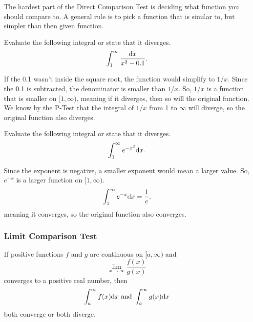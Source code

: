 The hardest part of the Direct Comparison Test is deciding what function you should compare to.
A general rule is to pick a function that is similar to, but simpler than then given function.

\begin{example}
	Evaluate the following integral or state that it diverges.
	\begin{equation*}
		\int_{1}^{\infty}{\frac{\mathrm{d} x}{x^2-0.1}}.
	\end{equation*}
\end{example}
\begin{answer}
	If the 0.1 wasn't inside the square root, the function would simplify to $1/x$.
	Since the 0.1 is subtracted, the denominator is smaller than $1/x$.
	So, $1/x$ is a function that is smaller on $[1,\infty)$, meaning if it diverges, then so will the original function.
	We know by the P-Test that the integral of $1/x$ from 1 to $\infty$ will diverge, so the original function also diverges.
\end{answer}

\begin{example}
	Evaluate the following integral or state that it diverges.
	\begin{equation*}
		\int_{1}^{\infty}{e^{-x^2}\mathrm{d} x}.
	\end{equation*}
\end{example}
\begin{answer}
	Since the exponent is negative, a smaller exponent would mean a larger value.
	So, $e^{-x}$ is a larger function on $[1,\infty)$.
	\begin{equation*}
		\int_{1}^{\infty}{e^{-x}\mathrm{d} x} = \frac{1}{e},
	\end{equation*}
	meaning it converges, so the original function also converges.
\end{answer}

\subsubsection{Limit Comparison Test}
\begin{lemma}
	If positive functions $f$ and $g$ are continuous on $[a,\infty)$ and
	\begin{equation*}
		\lim_{x\to\infty}{\frac{f(x)}{g(x)}}
	\end{equation*}
	converges to a positive real number, then
	\begin{equation*}
		\int_{a}^{\infty}{f(x)\mathrm{d} x} \text { and } \int_{a}^{\infty}{g(x)\mathrm{d} x}
	\end{equation*}
	both converge or both diverge.
\end{lemma}



